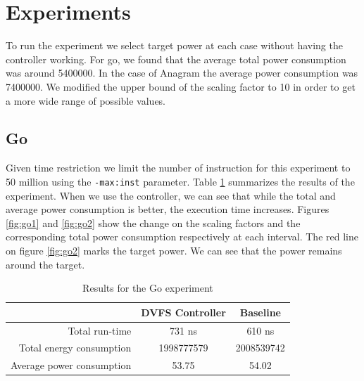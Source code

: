 \documentclass[10pt]{scrartcl}
\begin{document}

\FloatBarrier

\section{Experiments}
To run the experiment we select target power at each case without having the controller working. For go, we found that the average total power consumption was around 5400000.  In the case of Anagram the average power consumption was 7400000.  We modified the upper bound of the scaling factor to 10 in order to get a more wide range of possible values.

\subsection{Go}
Given time restriction we limit the number of instruction for this experiment to 50 million using the \texttt{-max:inst} parameter.  Table \ref{tab:go} summarizes the results of the experiment.  When we use the controller,  we can see that while the total and average power consumption is better, the execution time increases.  Figures \ref{fig:go1} and \ref{fig:go2} show the change on the scaling factors and the corresponding total power consumption respectively at each interval.  The red line on figure \ref{fig:go2} marks the target power.  We can see that the power remains around the target.

\begin{table}[h!]
\centering
\begin{tabular}{rcc}
\toprule
& DVFS Controller & Baseline\\
\midrule
Total run-time & 731 ns & 610 ns \\
Total energy consumption & 1998777579 & 2008539742 \\
Average power consumption & 53.75 & 54.02 \\
\bottomrule
\end{tabular}
\caption{Results for the Go experiment}\label{tab:go}
\end{table}
\end{document}
